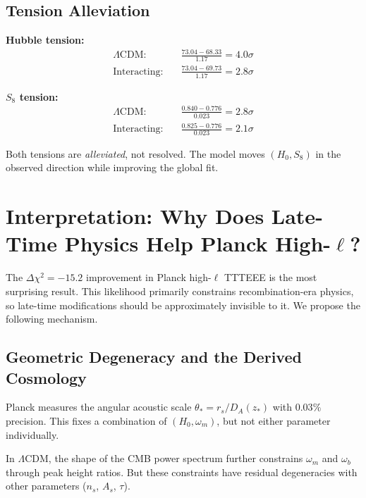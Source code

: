 \documentclass[twocolumn,showpacs,preprintnumbers,amsmath,amssymb,prd]{revtex4-2}
\begin{document}
\subsection{Tension Alleviation}

\textbf{Hubble tension:}
\begin{align}
\Lambda\text{CDM}: \quad &\frac{73.04 - 68.33}{1.17} = 4.0\sigma \\
\text{Interacting}: \quad &\frac{73.04 - 69.73}{1.17} = 2.8\sigma
\end{align}

\textbf{$S_8$ tension:}
\begin{align}
\Lambda\text{CDM}: \quad &\frac{0.840 - 0.776}{0.023} = 2.8\sigma \\
\text{Interacting}: \quad &\frac{0.825 - 0.776}{0.023} = 2.1\sigma
\end{align}

Both tensions are \textit{alleviated}, not resolved. The model moves $(H_0, S_8)$ in the observed direction while improving the global fit.

\section{Interpretation: Why Does Late-Time Physics Help Planck High-$\ell$?}
\label{sec:interpretation}

The $\Delta\chi^2 = -15.2$ improvement in Planck high-$\ell$ TTTEEE is the most surprising result. This likelihood primarily constrains recombination-era physics, so late-time modifications should be approximately invisible to it. We propose the following mechanism.

\subsection{Geometric Degeneracy and the Derived Cosmology}

Planck measures the angular acoustic scale $\theta_* = r_s / D_A(z_*)$ with $0.03\%$ precision. This fixes a combination of $(H_0, \omega_m)$, but not either parameter individually.

In $\Lambda$CDM, the shape of the CMB power spectrum further constrains $\omega_m$ and $\omega_b$ through peak height ratios. But these constraints have residual degeneracies with other parameters ($n_s$, $A_s$, $\tau$).
\end{document}
